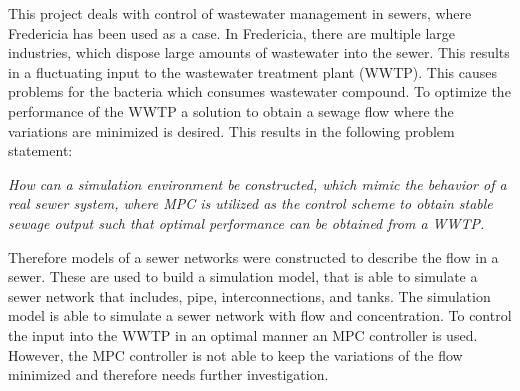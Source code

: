 This project deals with control of wastewater management in sewers, where Fredericia has been used as a case. In Fredericia, there are multiple large industries, which dispose large amounts of wastewater into the sewer. This results in a fluctuating input to the wastewater treatment plant (WWTP). This causes problems for the bacteria which consumes wastewater compound. 
To optimize the performance of the WWTP a solution to obtain a sewage flow where the variations are minimized is desired. 
This results in the following problem statement: 

\textit{How can a simulation environment be constructed, which mimic the behavior of a real sewer system, where MPC is utilized as the control scheme to obtain stable sewage output such that optimal performance can be obtained from a WWTP.} 

Therefore models of a sewer networks were constructed to describe the flow in a sewer. These are used to build a simulation model, that is able to simulate a sewer network that includes, pipe, interconnections, and tanks. The simulation model is able to simulate a sewer network with flow and concentration. To control the input into the WWTP in an optimal manner an MPC controller is used. However, the MPC controller is not able to keep the variations of the flow minimized and therefore needs further investigation.            








